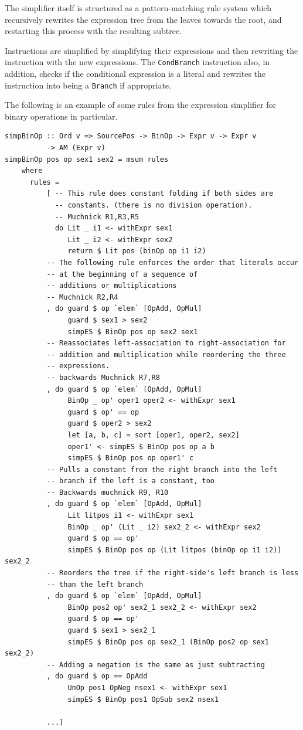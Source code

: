 \documentclass[11pt]{article}
\begin{document}
The simplifier itself is structured as a pattern-matching rule system
which recursively rewrites the expression tree from the leaves towards
the root, and restarting this process with the resulting subtree.

Instructions are simplified by simplifying their expressions and then
rewriting the instruction with the new expressions.  The
\texttt{CondBranch} instruction also, in addition, checks if the
conditional expression is a literal and rewrites the instruction into
being a \texttt{Branch} if appropriate.

The following is an example of some rules from the expression
simplifier for binary operations in particular.
{\footnotesize
\begin{verbatim}
simpBinOp :: Ord v => SourcePos -> BinOp -> Expr v -> Expr v
          -> AM (Expr v)
simpBinOp pos op sex1 sex2 = msum rules
    where
      rules =
          [ -- This rule does constant folding if both sides are
            -- constants. (there is no division operation).
            -- Muchnick R1,R3,R5
            do Lit _ i1 <- withExpr sex1
               Lit _ i2 <- withExpr sex2
               return $ Lit pos (binOp op i1 i2)
          -- The following rule enforces the order that literals occur
          -- at the beginning of a sequence of
          -- additions or multiplications
          -- Muchnick R2,R4
          , do guard $ op `elem` [OpAdd, OpMul]
               guard $ sex1 > sex2
               simpES $ BinOp pos op sex2 sex1
          -- Reassociates left-association to right-association for
          -- addition and multiplication while reordering the three
          -- expressions.
          -- backwards Muchnick R7,R8
          , do guard $ op `elem` [OpAdd, OpMul]
               BinOp _ op' oper1 oper2 <- withExpr sex1
               guard $ op' == op
               guard $ oper2 > sex2
               let [a, b, c] = sort [oper1, oper2, sex2]
               oper1' <- simpES $ BinOp pos op a b
               simpES $ BinOp pos op oper1' c
          -- Pulls a constant from the right branch into the left
          -- branch if the left is a constant, too
          -- Backwards muchnick R9, R10
          , do guard $ op `elem` [OpAdd, OpMul]
               Lit litpos i1 <- withExpr sex1
               BinOp _ op' (Lit _ i2) sex2_2 <- withExpr sex2
               guard $ op == op'
               simpES $ BinOp pos op (Lit litpos (binOp op i1 i2)) sex2_2
          -- Reorders the tree if the right-side's left branch is less
          -- than the left branch
          , do guard $ op `elem` [OpAdd, OpMul]
               BinOp pos2 op' sex2_1 sex2_2 <- withExpr sex2
               guard $ op == op'
               guard $ sex1 > sex2_1
               simpES $ BinOp pos op sex2_1 (BinOp pos2 op sex1 sex2_2)
          -- Adding a negation is the same as just subtracting
          , do guard $ op == OpAdd
               UnOp pos1 OpNeg nsex1 <- withExpr sex1
               simpES $ BinOp pos1 OpSub sex2 nsex1

          ...]
\end{verbatim}}
\end{document}
